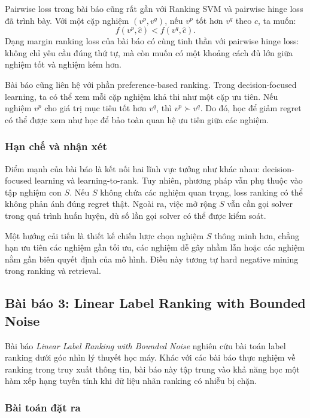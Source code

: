 Pairwise loss trong bài báo cũng rất gần với Ranking SVM và pairwise hinge loss đã trình bày. Với một cặp nghiệm \((v^p,v^q)\), nếu \(v^p\) tốt hơn \(v^q\) theo \(c\), ta muốn:
\[
    f(v^p,\hat{c}) < f(v^q,\hat{c}).
\]
Dạng margin ranking loss của bài báo có cùng tinh thần với pairwise hinge loss: không chỉ yêu cầu đúng thứ tự, mà còn muốn có một khoảng cách đủ lớn giữa nghiệm tốt và nghiệm kém hơn.

Bài báo cũng liên hệ với phần preference-based ranking. Trong decision-focused learning, ta có thể xem mỗi cặp nghiệm khả thi như một cặp ưu tiên. Nếu nghiệm \(v^p\) cho giá trị mục tiêu tốt hơn \(v^q\), thì \(v^p\succ v^q\). Do đó, học để giảm regret có thể được xem như học để bảo toàn quan hệ ưu tiên giữa các nghiệm.

\subsubsection{Hạn chế và nhận xét}

Điểm mạnh của bài báo là kết nối hai lĩnh vực tưởng như khác nhau: decision-focused learning và learning-to-rank. Tuy nhiên, phương pháp vẫn phụ thuộc vào tập nghiệm con \(S\). Nếu \(S\) không chứa các nghiệm quan trọng, loss ranking có thể không phản ánh đúng regret thật. Ngoài ra, việc mở rộng \(S\) vẫn cần gọi solver trong quá trình huấn luyện, dù số lần gọi solver có thể được kiểm soát.

Một hướng cải tiến là thiết kế chiến lược chọn nghiệm \(S\) thông minh hơn, chẳng hạn ưu tiên các nghiệm gần tối ưu, các nghiệm dễ gây nhầm lẫn hoặc các nghiệm nằm gần biên quyết định của mô hình. Điều này tương tự hard negative mining trong ranking và retrieval.

\subsection{Bài báo 3: Linear Label Ranking with Bounded Noise}

Bài báo \textit{Linear Label Ranking with Bounded Noise} nghiên cứu bài toán label ranking dưới góc nhìn lý thuyết học máy. Khác với các bài báo thực nghiệm về ranking trong truy xuất thông tin, bài báo này tập trung vào khả năng học một hàm xếp hạng tuyến tính khi dữ liệu nhãn ranking có nhiễu bị chặn.

\subsubsection{Bài toán đặt ra}

